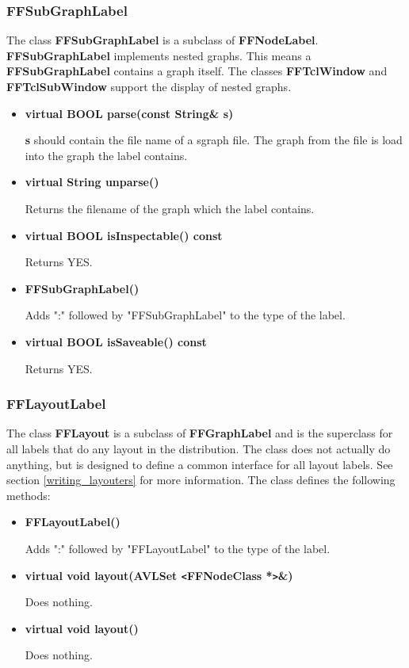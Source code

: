 \subsubsection{FFSubGraphLabel}

The class {\bf FFSubGraphLabel} is a subclass of {\bf
  FFNodeLabel}. {\bf FFSubGraphLabel} implements nested graphs.
This means a {\bf FFSubGraphLabel} contains a graph itself.
The classes {\bf FFTclWindow} and {\bf FFTclSubWindow} support
the display of nested graphs.

\begin{itemize}

\item{\bf virtual BOOL parse(const String\& s)}

{\bf s} should contain the file name of a sgraph file. The
graph from the file is load into the graph the label contains.

\item{\bf virtual String unparse()}

Returns the filename of the graph which the label contains.

\item{\bf virtual BOOL isInspectable() const}

Returns YES.
    
\item{\bf FFSubGraphLabel()}

Adds ":" followed by "FFSubGraphLabel" to the type of the label.

\item{\bf virtual BOOL isSaveable() const}

Returns YES.

\end{itemize}

\subsubsection{FFLayoutLabel}

The class {\bf FFLayout} is a subclass of {\bf FFGraphLabel} and
is the superclass for all labels that do any layout in the
distribution. The class does not actually do anything, but is
designed to define a common interface for all layout labels.
See section \vref{writing_layouters} for more information. The class
defines the following methods:

\begin{itemize}

\item{\bf FFLayoutLabel()}

Adds ":" followed by "FFLayoutLabel" to the type of the label.

\item{\bf virtual void layout(AVLSet \verb|<|FFNodeClass
    *\verb|>|\&)}

Does nothing.

\item{\bf virtual void layout()}

Does nothing.

\end{itemize}

